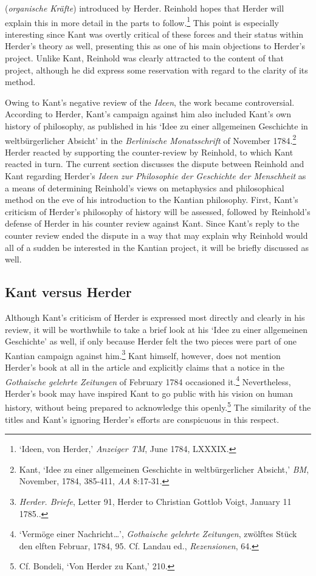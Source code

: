 (\textit{organische Kr\"{a}fte}) introduced by Herder. Reinhold hopes that Herder will explain this in more detail in the parts to follow.\footnote{ `Ideen, von Herder,' \textit{Anzeiger TM}, June 1784, LXXXIX.} This point is especially interesting since Kant was overtly critical of these forces and their status within Herder's theory as well, presenting this as one of his main objections to Herder's project. Unlike Kant, Reinhold was clearly attracted to the content of that project, although he did express some reservation with regard to the clarity of its method. 

Owing to Kant's negative review of the \textit{Ideen}, the work became controversial. According to Herder, Kant's campaign against him also included Kant's own history of philosophy, as published in his `Idee zu einer allgemeinen Geschichte in weltb\"{u}rgerlicher Absicht' in the \textit{Berlinische Monatsschrift }of November 1784.\footnote{ Kant, `Idee zu einer allgemeinen Geschichte in weltb\"{u}rgerlicher Absicht,' \textit{BM}, November, 1784, 385{-}411, \textit{AA} 8:17{-}31.} Herder reacted by supporting the counter{-}review by Reinhold, to which Kant reacted in turn. The current section discusses the dispute between Reinhold and Kant regarding Herder's \textit{Ideen zur Philosophie der Geschichte der Menschheit} as a means of determining Reinhold's views on metaphysics and philosophical method on the eve of his introduction to the Kantian philosophy. First, Kant's criticism of Herder's philosophy of history will be assessed, followed by Reinhold's defense of Herder in his counter review against Kant. Since Kant's reply to the counter review ended the dispute in a way that may explain why Reinhold would all of a sudden be interested in the Kantian project, it will be briefly discussed as well. 


\subsection{Kant versus Herder}


Although Kant's criticism of Herder is expressed most directly and clearly in his review, it will be worthwhile to take a brief look at his `Idee zu einer allgemeinen Geschichte' as well, if only because Herder felt the two pieces were part of one Kantian campaign against him.\footnote{ \textit{Herder. Briefe}, Letter 91, Herder to Christian Gottlob Voigt, January 11 1785..} Kant himself, however, does not mention Herder's book at all in the article and explicitly claims that a notice in the \textit{Gothaische gelehrte Zeitungen} of February 1784 occasioned it.\footnote{ `Verm\"{o}ge einer Nachricht\ldots ', \textit{Gothaische gelehrte Zeitungen}, zw\"{o}lftes St\"{u}ck den elften Februar, 1784, 95. Cf. Landau ed., \textit{Rezensionen}, 64.} Nevertheless, Herder's book may have inspired Kant to go public with his vision on human history, without being prepared to acknowledge this openly.\footnote{ Cf. Bondeli, `Von Herder zu Kant,' 210.} The similarity of the titles and Kant's ignoring Herder's efforts are conspicuous in this respect. 

